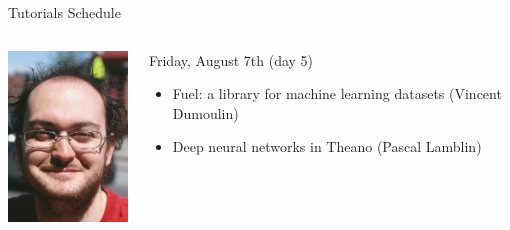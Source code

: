 \documentclass[a4paper,9pt]{beamer}
\begin{document}
\begin{frame}{Tutorials Schedule}
{\begin{columns}
\begin{column}{.07\textwidth}
          \includegraphics[width=\columnwidth]{lamblinp.jpg}
        \end{column}
        \begin{column}{.8\textwidth}
          \scriptsize
          Friday, August 7th (day 5)
          \begin{itemize}
            \item Fuel: a library for machine learning datasets (Vincent Dumoulin)
            \item Deep neural networks in Theano (Pascal Lamblin)
          \end{itemize}
          \vspace{2mm}
        \end{column}
      \end{columns}
    }


\end{frame}
\end{document}
